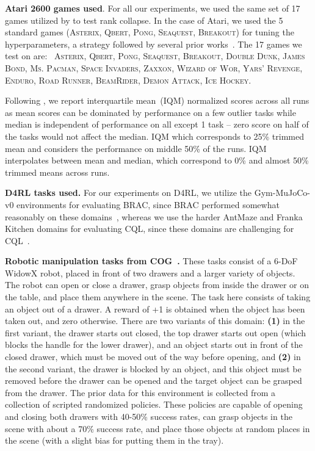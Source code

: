 {\bf Atari 2600 games used}. For all our experiments, we used the same set of 17 games utilized by \citet{kumar2021implicit} to test rank collapse. In the case of Atari, we used the 5 standard games (\textsc{Asterix}, \textsc{Qbert}, \textsc{Pong}, \textsc{Seaquest}, \textsc{Breakout}) for tuning the hyperparameters, a strategy followed by several prior works~\citep{gulcehre2020rl,agarwal2019optimistic,kumar2021implicit}. The 17 games we test on are: \ \textsc{Asterix}, \textsc{Qbert}, \textsc{Pong}, \textsc{Seaquest}, \textsc{Breakout}, \textsc{Double Dunk}, \textsc{James Bond}, \textsc{Ms. Pacman}, \textsc{Space Invaders}, \textsc{Zaxxon}, \textsc{Wizard of Wor}, \textsc{Yars' Revenge}, \textsc{Enduro}, \textsc{Road Runner}, \textsc{BeamRider}, \textsc{Demon Attack}, \textsc{Ice Hockey}.

Following \citet{agarwal2021precipice}, we report interquartile mean~(IQM) normalized scores across all runs as mean scores can be dominated by performance on a few outlier tasks while median is independent of performance on all except 1 task -- zero score on half of the tasks would not affect the median. IQM which corresponds to 25\% trimmed mean and considers the performance on middle 50\% of the runs. IQM interpolates between mean and median, which correspond to 0\% and almost 50\% trimmed means across runs.

{\bf D4RL tasks used.} For our experiments on D4RL, we utilize the Gym-MuJoCo-v0 environments for evaluating BRAC, since BRAC performed somewhat reasonably on these domains~\citep{fu2020d4rl}, whereas we use the harder AntMaze and Franka Kitchen domains for evaluating CQL, since these domains are challenging for CQL~\citep{kumar2020conservative}.

{\bf Robotic manipulation tasks from COG~\citep{singh2020cog}.} These tasks consist of a 6-DoF WidowX robot, placed in front of two drawers and a larger variety of objects. The robot can open or close a drawer, grasp objects from inside the drawer or on the table, and place them anywhere in the scene. The task here consists of taking an object out of a drawer. A reward of +1 is obtained when the object has been taken out, and zero otherwise. There are two variants of this domain: \textbf{(1)} in the first variant, the drawer starts out closed, the top drawer starts out open (which blocks the handle for the lower drawer), and an object starts out in front of the closed drawer,
which must be moved out of the way before opening, and \textbf{(2)} in the second variant, the drawer is blocked by an object, and this object must be removed before the drawer can be opened and the target object can be grasped from the drawer. The prior data for this environment is collected from a collection of scripted randomized policies. These policies are capable of opening and closing both drawers with 40-50\% success rates, can grasp objects in the scene with about a 70\% success rate, and place those objects at random places in the scene (with a slight bias for putting them in the tray). 

